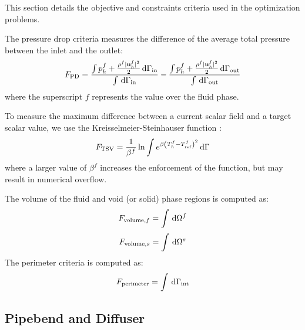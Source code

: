 This section details the objective and constraints criteria used in the optimization problems.

The pressure drop criteria measures the difference of the average total pressure between the inlet and the outlet:
%
\begin{equation}
	\centering
	\label{eq:pressure_drop_criteria}
	F_{\mathrm{PD}} =
	\frac{\int p^{f}_h + \frac{\rho^{f} \vert \mathbf{u}^{f}_h \vert^2}{2} \,\mathrm{d}\Gamma_{\mathrm{in}}}{\int \,\mathrm{d}\Gamma_{\mathrm{in}}} -
	\frac{\int p^{f}_h + \frac{\rho^{f} \vert \mathbf{u}^{f}_h \vert^2}{2} \,\mathrm{d}\Gamma_{\mathrm{out}}}{\int \,\mathrm{d}\Gamma_{\mathrm{out}}}
\end{equation}
%
\noindent
where the superscript $f$ represents the value over the fluid phase.

To measure the maximum difference between a current scalar field and a target scalar value, we use the Kreisselmeier-Steinhauser function \citep{KS:79}:
%
\begin{equation}
	\centering
	\label{eq:target_scalar_value_criteria}
	F_{\mathrm{TSV}} =
	\frac{1}{\beta^{f}} \ln \int e^{\beta\left( T^{f}_{h} - T_{\mathrm{ref}}^{f} \right)^2} \,\mathrm{d}\Gamma
\end{equation}
%
where a larger value of $\beta^{f}$ increases the enforcement of the function, but may result in numerical overflow.

The volume of the fluid and void (or solid) phase regions is computed as:
%
\begin{equation}
	\centering
	\label{eq:fluid_volume_criteria}
	F_{\mathrm{volume},f} =
	\int \,\mathrm{d}\Omega^{f}
\end{equation}
%
\begin{equation}
	\centering
	\label{eq:solid_volume_criteria}
	F_{\mathrm{volume},s} =
	\int \,\mathrm{d}\Omega^{s}
\end{equation}
%
The perimeter criteria is computed as:
%
\begin{equation}
	\centering
	\label{eq:perimeter_criteria}
	F_{\mathrm{perimeter}} = \int \,\mathrm{d}\Gamma_{\mathrm{int}}
\end{equation}
%

\subsection{Pipebend and Diffuser}
\label{sec:pipebend_and_diffuser}

